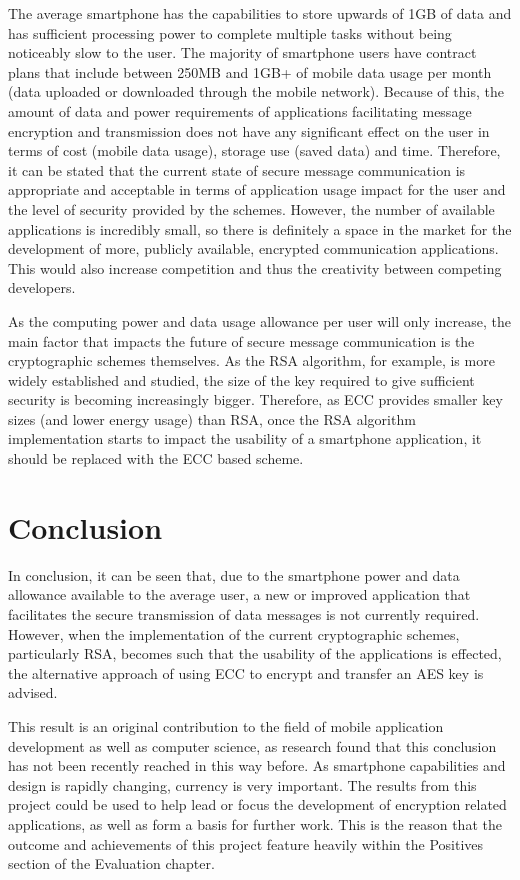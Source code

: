 \documentclass[a4paper,12pt]{report}
\begin{document}
The average smartphone has the capabilities to store upwards of 1GB of data and has sufficient processing power to complete multiple tasks without being noticeably slow to the user. The majority of smartphone users have contract plans that include between 250MB and 1GB+ of mobile data usage per month (data uploaded or downloaded through the mobile network). Because of this, the amount of data and power requirements of applications facilitating message encryption and transmission does not have any significant effect on the user in terms of cost (mobile data usage), storage use (saved data) and time. Therefore, it can be stated that the current state of secure message communication is appropriate and acceptable in terms of application usage impact for the user and the level of security provided by the schemes. However, the number of available applications is incredibly small, so there is definitely a space in the market for the development of more, publicly available, encrypted communication applications. This would also increase competition and thus the creativity between competing developers.

As the computing power and data usage allowance per user will only increase, the main factor that impacts the future of secure message communication is the cryptographic schemes themselves. As the RSA algorithm, for example, is more widely established and studied, the size of the key required to give sufficient security is becoming increasingly bigger. Therefore, as ECC provides smaller key sizes (and lower energy usage) than RSA, once the RSA algorithm implementation starts to impact the usability of a smartphone application, it should be replaced with the ECC based scheme. 

\section{Conclusion}

In conclusion, it can be seen that, due to the smartphone power and data allowance available to the average user, a new or improved application that facilitates the secure transmission of data messages is not currently required. However, when the implementation of the current cryptographic schemes, particularly RSA, becomes such that the usability of the applications is effected, the alternative approach of using ECC to encrypt and transfer an AES key is advised. 

This result is an original contribution to the field of mobile application development as well as computer science, as research found that this conclusion has not been recently reached in this way before. As smartphone capabilities and design is rapidly changing, currency is very important. The results from this project could be used to help lead or focus the development of encryption related applications, as well as form a basis for further work. This is the reason that the outcome and achievements of this project feature heavily within the Positives section of the Evaluation chapter. 
\end{document}
